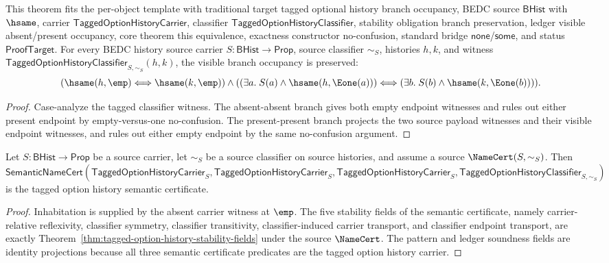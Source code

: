 \begin{theorem}
\label{thm:tagged-option-history-classifier-branch-occupancy-equivalence}
This theorem fits the per-object template with traditional target tagged optional
history branch occupancy, BEDC source $\mathsf{BHist}$ with $\hsame$, carrier
$\mathsf{TaggedOptionHistoryCarrier}$, classifier
$\mathsf{TaggedOptionHistoryClassifier}$, stability obligation branch preservation,
ledger visible absent/present occupancy, core theorem this equivalence, exactness
constructor no-confusion, standard bridge $\mathsf{none}$/$\mathsf{some}$, and
status $\mathsf{ProofTarget}$.
For every BEDC history source carrier $S:\mathsf{BHist}\to\mathsf{Prop}$, source
classifier $\sim_S$, histories $h,k$, and witness
$\mathsf{TaggedOptionHistoryClassifier}_{S,\sim_S}(h,k)$, the visible branch
occupancy is preserved:
$$
(\hsame(h,\emp) \Longleftrightarrow \hsame(k,\emp))
\land
((\exists a.\; S(a)\land\hsame(h,\Eone(a))) \Longleftrightarrow
(\exists b.\; S(b)\land\hsame(k,\Eone(b)))).
$$
\end{theorem}
\begin{proof}
Case-analyze the tagged classifier witness. The absent-absent branch gives both
empty endpoint witnesses and rules out either present endpoint by
empty-versus-one no-confusion. The present-present branch projects the two source
payload witnesses and their visible endpoint witnesses, and rules out either
empty endpoint by the same no-confusion argument.
\end{proof}

\begin{theorem}
\label{thm:tagged-option-history-semantic-certificate}
Let $S:\mathsf{BHist}\to\mathsf{Prop}$ be a source carrier, let $\sim_S$ be a
source classifier on source histories, and assume a source
$\NameCert(S,\sim_S)$. Then
$\mathsf{SemanticNameCert}(\mathsf{TaggedOptionHistoryCarrier}_S,
\mathsf{TaggedOptionHistoryCarrier}_S,\mathsf{TaggedOptionHistoryCarrier}_S,
\mathsf{TaggedOptionHistoryClassifier}_{S,\sim_S})$ is the tagged option history
semantic certificate.
\end{theorem}
\begin{proof}
Inhabitation is supplied by the absent carrier witness at $\emp$. The five
stability fields of the semantic certificate, namely carrier-relative
reflexivity, classifier symmetry, classifier transitivity, classifier-induced
carrier transport, and classifier endpoint transport, are exactly
Theorem~\ref{thm:tagged-option-history-stability-fields} under the source
$\NameCert$. The pattern and ledger soundness fields are identity projections
because all three semantic certificate predicates are the tagged option history
carrier.
\end{proof}

